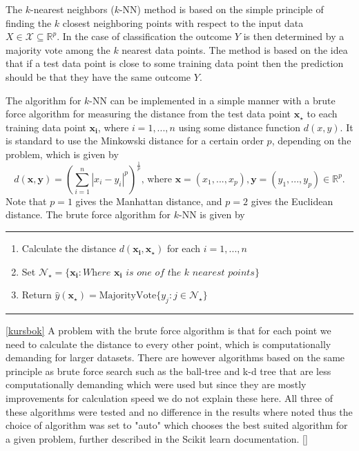 \documentclass[../../project.tex]{subfiles}
\begin{document}
	The $k$-nearest neighbors ($k$-NN) method is based on the simple principle of finding the $k$ closest neighboring points with respect to the input data $X \in \mathcal{X} \subseteq \mathbb{R}^p$. In the case of classification the outcome $Y$ is then determined by a majority vote among the $k$ nearest data points. The method is based on the idea that if a test data point is close to some training data point then the prediction should be that they have the same outcome $Y$.
	
	The algorithm for $k$-NN can be implemented in a simple manner with a brute force algorithm for measuring the distance from the test data point $\boldsymbol{x_{\star}}$ to each training data point $\boldsymbol{x_{i}}$, where $i = 1,...,n$ using some distance function $d(x,y)$. It is standard to use the Minkowski distance for a certain order $p$, depending on the problem, which is given by
	\begin{equation}
	d(\boldsymbol{x},\boldsymbol{y}) = \left( \sum_{i=1}^{n} |x_{i} - y_{i}|^{p} \right)^{\frac{1}{p}}\text{, where } \boldsymbol{x} = (x_1,...,x_p),\boldsymbol{y}=(y_1,...,y_p)
	\in \mathbb{R}^p.
	\end{equation}
	Note that $p=1$ gives the Manhattan distance, and $p=2$ gives the Euclidean distance. The brute force algorithm for $k$-NN is given by 
	\par\noindent\rule{\textwidth}{0.4pt}
	\begin{enumerate}
		\item Calculate the distance $d(\boldsymbol{x_{i}},\boldsymbol{x_{\star}})$ for each $i = 1,...,n$
		\item Set $\mathcal{N}_{\star} = \{ \boldsymbol{x_i}: \textit{Where } \boldsymbol{x_i} \textit{ is one of the k nearest points} \}$
		\item Return $\hat{y}(\boldsymbol{x_{\star}}) = \text{MajorityVote}\{y_j : j \in \mathcal{N}_{\star}\} $
	\end{enumerate}
	\par\noindent\rule{\textwidth}{0.4pt}
	
	\ref{kursbok}
	A problem with the brute force algorithm is that for each point we need to calculate the distance to every other point, which is computationally demanding for larger datasets. There are however algorithms based on the same principle as brute force search such as the ball-tree and k-d tree that are less computationally demanding which were used but since they are mostly improvements for calculation speed we do not explain these here. All three of these algorithms were tested and no difference in the results where noted thus the choice of algorithm was set to "auto" which chooses the best suited algorithm for a given problem, further described in the Scikit learn documentation. \ref{} 
	
\end{document}
